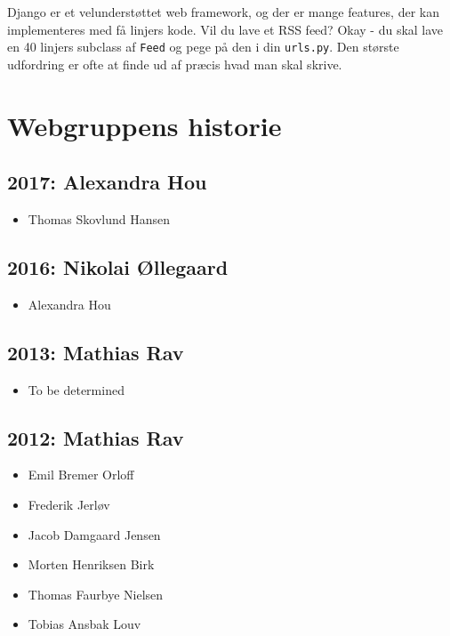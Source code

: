 \documentclass[article,oneside,a4paper]{memoir}
\begin{document}
Django er et velunderstøttet web framework, og der er mange features, der kan
implementeres med få linjers kode. Vil du lave et RSS feed? Okay - du skal lave
en 40 linjers subclass af \texttt{Feed} og pege på den i din \texttt{urls.py}.
Den største udfordring er ofte at finde ud af præcis hvad man skal skrive.

\chapter{Webgruppens historie}


\section*{2017: Alexandra Hou}

\begin{itemize}
  \item Thomas Skovlund Hansen
\end{itemize}

\section*{2016: Nikolai Øllegaard}

\begin{itemize}
  \item Alexandra Hou
\end{itemize}

\section*{2013: Mathias Rav}

\begin{itemize}
  \item To be determined
\end{itemize}

\section*{2012: Mathias Rav}

\begin{itemize}
  \item Emil Bremer Orloff
  \item Frederik Jerløv
  \item Jacob Damgaard Jensen
  \item Morten Henriksen Birk
  \item Thomas Faurbye Nielsen
  \item Tobias Ansbak Louv
\end{itemize}
\end{document}
